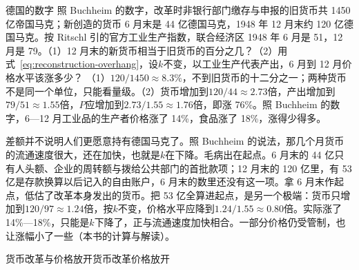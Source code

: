 \begin{example}{德国的数字}\label{ex:reconstruction-germany}
照 Buchheim 的数字，改革时非银行部门缴存与申报的旧货币共 1450 亿帝国马克；新创造的货币 6 月末是 44 亿德国马克，1948 年 12 月末约 120 亿德国马克\cite{buchheim1988}。按 Ritschl 引的官方工业生产指数，联合经济区 1948 年 6 月是 51，12 月是 79\cite{ritschl1985}。（1）12 月末的新货币相当于旧货币的百分之几？（2）用式~\eqref{eq:reconstruction-overhang}，设$k$不变，以工业生产代表产出，6 月到 12 月价格水平该涨多少？
\solution
（1）$120/1450\approx8.3\%$，不到旧货币的十二分之一；两种货币不是同一个单位，只能看量级。（2）货币增加到$120/44\approx2.73$倍，产出增加到$79/51\approx1.55$倍，$P$应增加到$2.73/1.55\approx1.76$倍，即涨 76\%。照 Buchheim 的数字，6—12 月工业品的生产者价格涨了 14\%，食品涨了 18\%，涨得少得多\cite{buchheim1988}。

差额并不说明人们更愿意持有德国马克了。照 Buchheim 的说法，那几个月货币的流通速度很大，还在加快，也就是$k$在下降\cite{buchheim1988}。毛病出在起点。6 月末的 44 亿只有人头额、企业的周转额与拨给公共部门的首批款项；12 月末的 120 亿里，有 53 亿是存款换算以后记入的自由账户，6 月末的数里还没有这一项\cite{buchheim1988}。拿 6 月末作起点，低估了改革本身发出的货币。把 53 亿全算进起点，是另一个极端：货币只增加到$120/97\approx1.24$倍，按$k$不变，价格水平应降到$1.24/1.55\approx0.80$倍。实际涨了 14\%—18\%，只能是$k$下降了，正与流通速度加快相合。一部分价格仍受管制，也让涨幅小了一些（本书的计算与解读）。
\end{example}

\begin{compare}{货币改革与价格放开}{货币改革}{价格放开}
\end{compare}

